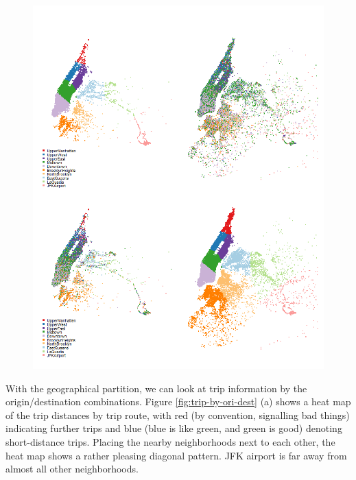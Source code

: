 \documentclass[10pt,a4paper]{article} %
\begin{document}
{        
    \begin{figure}
    \centering
        \includegraphics[width=\linewidth]{trip_by_pudo.png}
        \label{fig:trip-by-pudo}
    \end{figure}
    
    
    With the geographical partition, we can look at trip information by the origin/destination combinations.
    Figure \ref{fig:trip-by-ori-dest} (a) shows a heat map of the trip distances by trip route, with red (by convention, signalling bad things) indicating further trips and blue (blue is like green, and green is good) denoting short-distance trips. Placing the nearby neighborhoods next to each other, the heat map shows a rather pleasing diagonal pattern. JFK airport is far away from almost all other neighborhoods.
    
}
\end{document}
